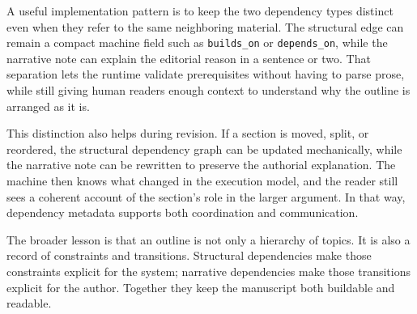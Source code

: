 \documentclass[11pt]{article}
\begin{document}
A useful implementation pattern is to keep the two dependency types distinct even when they refer to the same neighboring material. The structural edge can remain a compact machine field such as \texttt{builds\_on} or \texttt{depends\_on}, while the narrative note can explain the editorial reason in a sentence or two. That separation lets the runtime validate prerequisites without having to parse prose, while still giving human readers enough context to understand why the outline is arranged as it is.

This distinction also helps during revision. If a section is moved, split, or reordered, the structural dependency graph can be updated mechanically, while the narrative note can be rewritten to preserve the authorial explanation. The machine then knows what changed in the execution model, and the reader still sees a coherent account of the section's role in the larger argument. In that way, dependency metadata supports both coordination and communication.

The broader lesson is that an outline is not only a hierarchy of topics. It is also a record of constraints and transitions. Structural dependencies make those constraints explicit for the system; narrative dependencies make those transitions explicit for the author. Together they keep the manuscript both buildable and readable.
\end{document}
